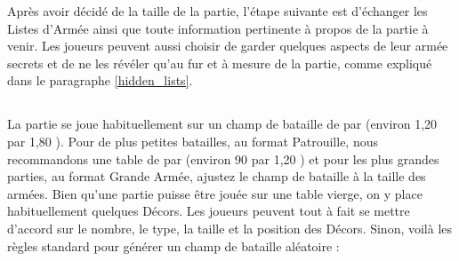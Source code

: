 Après avoir décidé de la taille de la partie, l'étape suivante est d'échanger les Listes d'Armée ainsi que toute information pertinente à propos de la partie à venir. Les joueurs peuvent aussi choisir de garder quelques aspects de leur armée secrets et de ne les révéler qu'au fur et à mesure de la partie, comme expliqué dans le paragraphe \ref{hidden_lists}.

\newpage
\subsection[Installer le champ de bataille]{}

La partie se joue habituellement sur un champ de bataille de  par  (environ 1,20 {\meter} par 1,80 {\meter}). Pour de plus petites batailles, au format Patrouille, nous recommandons une table de  par  (environ 90 {\centi\meter} par 1,20 {\meter}) et pour les plus grandes parties, au format Grande Armée, ajustez le champ de bataille à la taille des armées. Bien qu'une partie puisse être jouée sur une table vierge, on y place habituellement quelques Décors. Les joueurs peuvent tout à fait se mettre d'accord sur le nombre, le type, la taille et la position des Décors. Sinon, voilà les règles standard pour générer un champ de bataille aléatoire :

